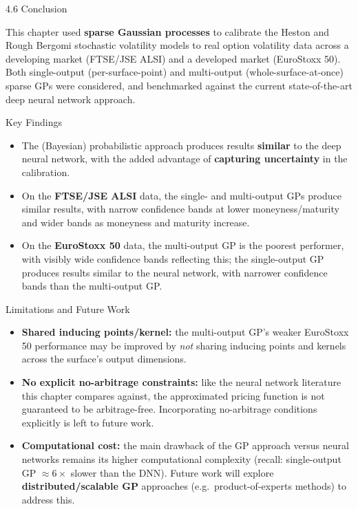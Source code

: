 \documentclass[aspectratio=169,10pt]{beamer}
\begin{document}
\begin{frame}[allowframebreaks]{4.6 Conclusion}

This chapter used \textbf{sparse Gaussian processes} to calibrate the
Heston and Rough Bergomi stochastic volatility models to real option
volatility data across a developing market (FTSE/JSE ALSI) and a
developed market (EuroStoxx 50). Both single-output (per-surface-point)
and multi-output (whole-surface-at-once) sparse GPs were considered, and
benchmarked against the current state-of-the-art deep neural network
approach.

\begin{block}{Key Findings}
\begin{itemize}
  \item The (Bayesian) probabilistic approach produces results
        \textbf{similar} to the deep neural network, with the added
        advantage of \textbf{capturing uncertainty} in the calibration.
  \item On the \textbf{FTSE/JSE ALSI} data, the single- and multi-output
        GPs produce similar results, with narrow confidence bands at
        lower moneyness/maturity and wider bands as moneyness and
        maturity increase.
  \item On the \textbf{EuroStoxx 50} data, the multi-output GP is the
        poorest performer, with visibly wide confidence bands reflecting
        this; the single-output GP produces results similar to the
        neural network, with narrower confidence bands than the
        multi-output GP.
\end{itemize}
\end{block}

\framebreak

\begin{alertblock}{Limitations and Future Work}
\begin{itemize}
  \item \textbf{Shared inducing points/kernel:} the multi-output GP's
        weaker EuroStoxx 50 performance may be improved by \emph{not}
        sharing inducing points and kernels across the surface's output
        dimensions.
  \item \textbf{No explicit no-arbitrage constraints:} like the neural
        network literature this chapter compares against, the
        approximated pricing function is not guaranteed to be
        arbitrage-free. Incorporating no-arbitrage conditions explicitly
        is left to future work.
  \item \textbf{Computational cost:} the main drawback of the GP
        approach versus neural networks remains its higher computational
        complexity (recall: single-output GP $\approx 6\times$ slower
        than the DNN). Future work will explore
        \textbf{distributed/scalable GP} approaches (e.g.\
        product-of-experts methods) to address this.
\end{itemize}
\end{alertblock}

\end{frame}
\end{document}
